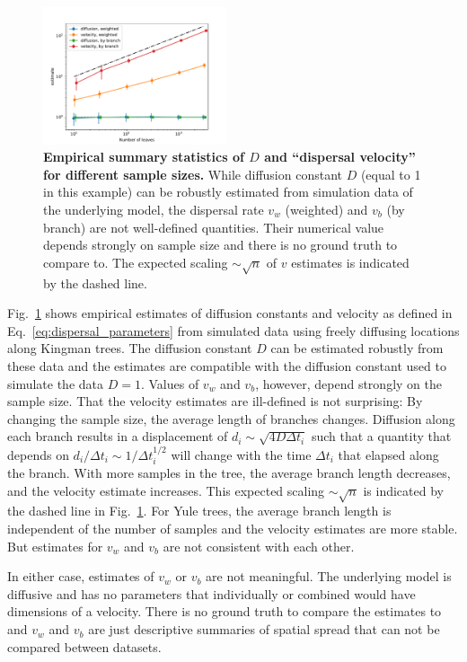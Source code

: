 \documentclass[aps,rmp, twocolumn]{revtex4}
\begin{document}
\begin{figure}[tb]
    \includegraphics*[width=0.48\textwidth]{figures/kingman_dispersal.pdf}
    \caption{\label{fig:D_and_v}{\bf Empirical summary statistics of $D$ and ``dispersal velocity'' for different sample sizes.}
    While diffusion constant $D$ (equal to 1 in this example) can be robustly estimated from simulation data of the underlying model, the dispersal rate $v_w$ (weighted) and $v_b$ (by branch) are not well-defined quantities. Their numerical value depends strongly on sample size and there is no ground truth to compare to. The expected scaling $\sim \sqrt{n}$ of $v$ estimates is indicated by the dashed line.}
\end{figure}


Fig.~\ref{fig:D_and_v} shows empirical estimates of diffusion constants and velocity as defined in Eq.~\ref{eq:dispersal_parameters} from simulated data using freely diffusing locations along Kingman trees.
The diffusion constant $D$ can be estimated robustly from these data and the estimates are compatible with the diffusion constant used to simulate the data $D=1$.
Values of $v_w$ and $v_b$, however, depend strongly on the sample size.
That the velocity estimates are ill-defined is not surprising: By changing the sample size, the average length of branches changes. Diffusion along each branch results in a displacement of $d_i \sim \sqrt{4D\Delta t_i}$ such that a quantity that depends on $d_i / \Delta t_i \sim 1/\Delta t_i^{1/2}$ will change with the time $\Delta t_i$ that elapsed along the branch.
With more samples in the tree, the average branch length decreases, and the velocity estimate increases.
This expected scaling $\sim \sqrt{n}$ is indicated by the dashed line in Fig.~\ref{fig:D_and_v}.
For Yule trees, the average branch length is independent of the number of samples and the velocity estimates are more stable.
But estimates for $v_w$ and $v_b$ are not consistent with each other.

In either case, estimates of $v_w$ or $v_b$ are not meaningful.
The underlying model is diffusive and has no parameters that individually or combined would have dimensions of a velocity.
There is no ground truth to compare the estimates to and $v_w$ and $v_b$ are just descriptive summaries of spatial spread that can not be compared between datasets.
\end{document}
